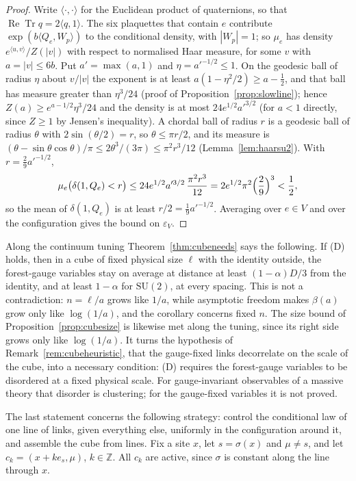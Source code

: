 \documentclass[aps,prd,twocolumn,superscriptaddress,nofootinbib,longbibliography,floatfix,amsmath,amssymb,10pt]{revtex4-2}
\theoremstyle{definition}
\theoremstyle{remark}
\newcommand{\Z}{\mathbb{Z}}
\newcommand{\SU}{\mathrm{SU}}
\newcommand{\ReTr}{\operatorname{Re}\operatorname{Tr}}
\begin{document}
\begin{proof}
Write $\langle\cdot,\cdot\rangle$ for the Euclidean product of quaternions,
so that $\ReTr q=2\langle q,1\rangle$. The six plaquettes that contain $e$
contribute $\exp(b\langle Q_e,W_p\rangle)$ to the conditional density, with
$|W_p|=1$; so $\mu_e$ has density $e^{\langle u,v\rangle}/Z(|v|)$ with respect
to normalised Haar measure, for some $v$ with $a=|v|\le6b$. Put
$a'=\max(a,1)$ and $\eta=a'^{-1/2}\le1$. On the geodesic ball of radius $\eta$
about $v/|v|$ the exponent is at least $a(1-\eta^2/2)\ge a-\frac12$, and that
ball has measure greater than $\eta^3/24$ (proof of
Proposition~\ref{prop:slowline}); hence $Z(a)\ge e^{a-1/2}\eta^3/24$ and the
density is at most $24e^{1/2}a'^{3/2}$ (for $a<1$ directly, since $Z\ge1$ by
Jensen's inequality). A chordal ball of radius $r$ is a geodesic ball of
radius $\theta$ with $2\sin(\theta/2)=r$, so $\theta\le\pi r/2$, and its
measure is $(\theta-\sin\theta\cos\theta)/\pi\le2\theta^3/(3\pi)\le\pi^2r^3/12$
(Lemma~\ref{lem:haarsu2}).
With $r=\frac29a'^{-1/2}$,
\[
\mu_e\bigl(\delta(1,Q_e)<r\bigr)\le24e^{1/2}a'^{3/2}\,\frac{\pi^2r^3}{12}
=2e^{1/2}\pi^2\Bigl(\frac29\Bigr)^3<\frac12 ,
\]
so the mean of $\delta(1,Q_e)$ is at least $r/2=\frac19a'^{-1/2}$. Averaging
over $e\in V$ and over the configuration gives the bound on $\varepsilon_V$.
\end{proof}

Along the continuum tuning Theorem~\ref{thm:cubeneeds} says the following.
If (D) holds, then in a cube of fixed physical size $\ell$ with the identity
outside, the forest-gauge variables stay on average at distance at least
$(1-\alpha)D/3$ from the identity, and at least $1-\alpha$ for $\SU(2)$, at
every spacing. This is not a
contradiction: $n=\ell/a$ grows like $1/a$, while asymptotic freedom makes
$\beta(a)$ grow only like $\log(1/a)$, and the corollary concerns fixed $n$.
The size bound of Proposition~\ref{prop:cubesize} is likewise met along the
tuning, since its right side grows only like $\log(1/a)$.
It turns the hypothesis of Remark~\ref{rem:cubeheuristic}, that the
gauge-fixed links decorrelate on the scale of the cube, into a necessary
condition: (D) requires the forest-gauge variables to be disordered at a
fixed physical scale. For gauge-invariant observables of a massive theory
that disorder is clustering; for the gauge-fixed variables it is not proved.

The last statement concerns the following strategy: control the
conditional law of one line of links, given everything else, uniformly in
the configuration around it, and assemble the cube from lines. Fix a site
$x$, let $s=\sigma(x)$ and $\mu\ne s$, and let $c_k=(x+ke_s,\mu)$, $k\in\Z$.
All $c_k$ are active, since $\sigma$ is constant along the line through $x$.
\end{document}
